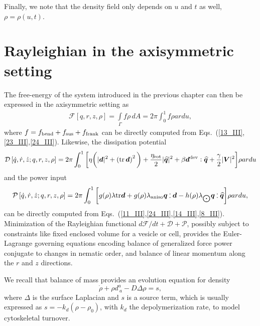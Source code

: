 Finally, we note that the density field only depends on $u$ and $t$ as well, $\rho = \rho(u,t)$. 

\section{Rayleighian in the axisymmetric setting} \label{Rayl_axi}

The free-energy of the system introduced in the previous chapter can then be expressed in the axisymmetric setting as
\begin{align} \label{F_axi}
   \mathcal{F}[q, r, z, \rho] = \underset{\Gamma}{\int} f \rho \,d A  = 2\pi \int_0^1 f \rho a r du,
\end{align}
where $f = f_{\rm bend} +  f_{\rm sus} +  f_{\rm frank}$ can be directly computed from Eqs.~(\ref{13_III},\ref{23_III},\ref{24_III}). Likewise, the dissipation potential
\begin{align} 
   \mathcal{D}\left[\dot{q},\dot{r},\dot{z}; q, r, z, \rho \right] = 
 2\pi \int_0^1 \bigg [  \eta \bigg(  \vert \bm{d}\vert^2 + \left(\text{tr} \, \bm{d}\right)^2\bigg) +   \frac{\eta_{\text{rot}}}{2}  \vert\widehat{\bm{q}}\vert^2 +  \beta  \bm{d}^{\rm dev}:\widehat{\bm{q}}   +  \frac{\gamma}{2} \vert\bm{V}\vert^2 \bigg]  \rho a r du   
\end{align}
and the power input 
 \begin{align}  
  \mathcal{P} \left[\dot{q},\dot{r},\dot{z}; q, r, z, \rho \right]  = 2\pi \int_0^1  \bigg[ g(\rho)\lambda \text{tr}\bm{d} +  g(\rho)\lambda_{\rm aniso}  \bm{q}\cddot \bm{d} -   h(\rho)\lambda_{\bigodot}  \bm{q} \cddot \widehat{\bm{q}}  \bigg] \rho a r du,
\end{align}
can be directly computed from Eqs.~(\ref{11_III},\ref{24_III},\ref{14_III},\ref{8_III}).
Minimization of the Rayleighian functional $d \mathcal{F}/dt + \mathcal{D} + \mathcal{P}$, possibly subject to constraints like fixed enclosed volume for a vesicle or cell, provides the Euler-Lagrange governing equations encoding balance of generalized force power conjugate to changes in nematic order, and balance of linear momentum along the $r$ and $z$ directions. 

We recall that balance of mass provides an evolution equation for  density 
\begin{equation}  \label{89_II_8}
    \dot{\rho} + \rho d_{~ a}^a   - D \Delta\rho=  s,
\end{equation}
where $\Delta$ is the surface Laplacian and $s$ is a source term, which is usually expressed as $s = -k_d(\rho-\rho_0)$, with $k_d$ the depolymerization rate, to model cytoskeletal turnover. 


